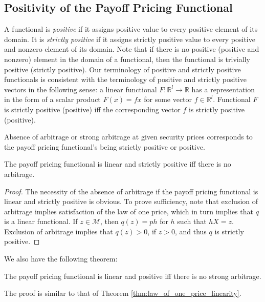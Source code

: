 \documentclass[\topdir/lecture\_notes.tex]{subfiles}
\begin{document}
\subsection{Positivity of the Payoff Pricing Functional}
A functional is \emph{positive} if it assigns positive value to every positive element of its domain. It is \emph{strictly positive} if it assigns strictly positive value to every positive and nonzero element of its domain. Note that if there is no positive (positive and nonzero) element in the domain of a functional, then the functional is trivially positive (strictly positive). Our terminology of positive and strictly positive functionals is consistent with the terminology of positive and strictly positive vectors in the following sense: a linear functional \(F: \mathbb{R}^{l} \rightarrow \mathbb{R}\) has a representation in the form of a scalar product \(F(x)=f x\) for some vector \(f \in \mathbb{R}^{l}\). Functional \(F\) is strictly positive (positive) iff the corresponding vector \(f\) is strictly positive (positive).

Absence of arbitrage or strong arbitrage at given security prices corresponds to the payoff pricing functional's being strictly positive or positive.

\begin{theorem}
\label{thm:linear}
The payoff pricing functional is linear and strictly positive iff there is no arbitrage.
\end{theorem}
\begin{proof}
The necessity of the absence of arbitrage if the payoff pricing functional is linear and strictly positive is obvious. To prove sufficiency, note that exclusion of arbitrage implies satisfaction of the law of one price, which in turn implies that \(q\) is a linear functional. If \(z \in \mathcal{M}\), then \(q(z)=p h\) for \(h\) such that \(h X=z\). Exclusion of arbitrage implies that \(q(z)>0\), if \(z>0\), and thus \(q\) is strictly positive.
\end{proof}
We also have the following theorem:
\begin{theorem}
\label{thm:positive}
The payoff pricing functional is linear and positive iff there is no strong arbitrage.
\end{theorem}
The proof is similar to that of Theorem \ref{thm:law_of_one_price_linearity}.
\end{document}
